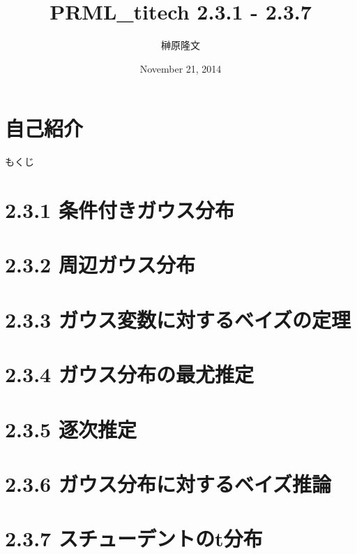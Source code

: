 \documentclass[dvipdfmx]{beamer}
\title{PRML\_titech 2.3.1 - 2.3.7}
\author{榊原隆文}
\date{November 21, 2014}
\begin{document}
\maketitle

 \section*{自己紹介}
 

 \begin{frame}{もくじ}
  \tableofcontents
 \end{frame}

 \section{2.3.1 条件付きガウス分布}
 

 \section{2.3.2 周辺ガウス分布}
 

 \section{2.3.3 ガウス変数に対するベイズの定理}
 

 \section{2.3.4 ガウス分布の最尤推定}
 

 \section{2.3.5 逐次推定}
 

 \section{2.3.6 ガウス分布に対するベイズ推論}
 

 \section{2.3.7 スチューデントのt分布}
 
\end{document}
